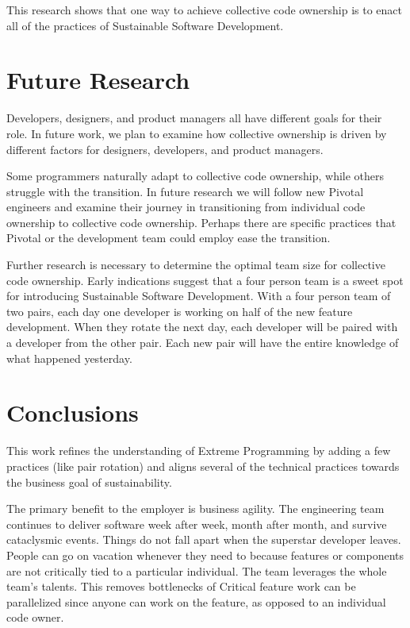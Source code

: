 \begin{table}[]

This research shows that one way to achieve collective code ownership is to enact all of the practices of Sustainable Software Development.

\section{Future Research}
Developers, designers, and product managers all have different goals for their role. In future work,  we plan to examine how collective ownership is driven by different factors for designers, developers, and product managers.

Some programmers naturally adapt to collective code ownership, while others struggle with the transition. In future research we will follow new Pivotal engineers and examine their journey in transitioning from individual code ownership to collective code ownership. Perhaps there are 
specific practices that Pivotal or the development team could employ ease the transition. 

Further research is necessary to determine the optimal team size for collective code ownership. Early indications suggest that a four person team is a sweet spot for introducing Sustainable Software Development. With a four person team of two pairs, each day one developer is working on half of the new feature development. When they rotate the next day, each developer will be paired with a developer from the other pair. Each new pair will have the entire knowledge of what happened yesterday. 


\section{Conclusions}
This work refines the understanding of Extreme Programming by adding a few practices (like pair rotation) and aligns several of the technical practices towards the business goal of sustainability.

The primary benefit to the employer is business agility. The engineering team continues to deliver software week after week, month after month, and survive cataclysmic events. Things do not fall apart when the superstar developer leaves. People can go on vacation whenever they need to because features or components are not critically tied to a particular individual. The team leverages the whole team's talents. This removes bottlenecks of  Critical feature work can be parallelized since anyone can work on the feature, as opposed to an individual code owner. 


\end{table}
